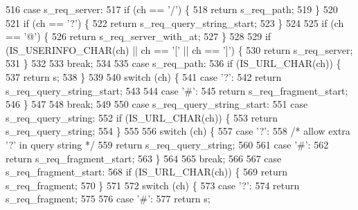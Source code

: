 \begin{DoxyCode}
516     \textcolor{keywordflow}{case} s_req_server:
517       \textcolor{keywordflow}{if} (ch == \textcolor{charliteral}{'/'}) \{
518         \textcolor{keywordflow}{return} s_req_path;
519       \}
520 
521       \textcolor{keywordflow}{if} (ch == \textcolor{charliteral}{'?'}) \{
522         \textcolor{keywordflow}{return} s_req_query_string_start;
523       \}
524 
525       \textcolor{keywordflow}{if} (ch == \textcolor{charliteral}{'@'}) \{
526         \textcolor{keywordflow}{return} s_req_server_with_at;
527       \}
528 
529       \textcolor{keywordflow}{if} (IS_USERINFO_CHAR(ch) || ch == \textcolor{charliteral}{'['} || ch == \textcolor{charliteral}{']'}) \{
530         \textcolor{keywordflow}{return} s_req_server;
531       \}
532 
533       \textcolor{keywordflow}{break};
534 
535     \textcolor{keywordflow}{case} s_req_path:
536       \textcolor{keywordflow}{if} (IS_URL_CHAR(ch)) \{
537         \textcolor{keywordflow}{return} s;
538       \}
539 
540       \textcolor{keywordflow}{switch} (ch) \{
541         \textcolor{keywordflow}{case} \textcolor{charliteral}{'?'}:
542           \textcolor{keywordflow}{return} s_req_query_string_start;
543 
544         \textcolor{keywordflow}{case} \textcolor{charliteral}{'#'}:
545           \textcolor{keywordflow}{return} s_req_fragment_start;
546       \}
547 
548       \textcolor{keywordflow}{break};
549 
550     \textcolor{keywordflow}{case} s_req_query_string_start:
551     \textcolor{keywordflow}{case} s_req_query_string:
552       \textcolor{keywordflow}{if} (IS_URL_CHAR(ch)) \{
553         \textcolor{keywordflow}{return} s_req_query_string;
554       \}
555 
556       \textcolor{keywordflow}{switch} (ch) \{
557         \textcolor{keywordflow}{case} \textcolor{charliteral}{'?'}:
558           \textcolor{comment}{/* allow extra '?' in query string */}
559           \textcolor{keywordflow}{return} s_req_query_string;
560 
561         \textcolor{keywordflow}{case} \textcolor{charliteral}{'#'}:
562           \textcolor{keywordflow}{return} s_req_fragment_start;
563       \}
564 
565       \textcolor{keywordflow}{break};
566 
567     \textcolor{keywordflow}{case} s_req_fragment_start:
568       \textcolor{keywordflow}{if} (IS_URL_CHAR(ch)) \{
569         \textcolor{keywordflow}{return} s_req_fragment;
570       \}
571 
572       \textcolor{keywordflow}{switch} (ch) \{
573         \textcolor{keywordflow}{case} \textcolor{charliteral}{'?'}:
574           \textcolor{keywordflow}{return} s_req_fragment;
575 
576         \textcolor{keywordflow}{case} \textcolor{charliteral}{'#'}:
577           \textcolor{keywordflow}{return} s;

\end{DoxyCode}
